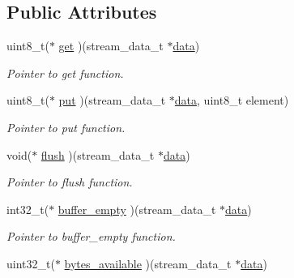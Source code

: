 \subsection*{Public Attributes}
\begin{DoxyCompactItemize}
\item 
\hypertarget{structbyte__stream__t_a434168a7d223feb6e21f6b2494879d1d}{uint8\+\_\+t($\ast$ \hyperlink{structbyte__stream__t_a434168a7d223feb6e21f6b2494879d1d}{get} )(stream\+\_\+data\+\_\+t $\ast$\hyperlink{structbyte__stream__t_a2869ca97951516e26f6dd0b215d9d4f8}{data})}\label{structbyte__stream__t_a434168a7d223feb6e21f6b2494879d1d}

\begin{DoxyCompactList}\small\item\em Pointer to get function. \end{DoxyCompactList}\item 
\hypertarget{structbyte__stream__t_ab297bd24b84a01414eee043c58332cc0}{uint8\+\_\+t($\ast$ \hyperlink{structbyte__stream__t_ab297bd24b84a01414eee043c58332cc0}{put} )(stream\+\_\+data\+\_\+t $\ast$\hyperlink{structbyte__stream__t_a2869ca97951516e26f6dd0b215d9d4f8}{data}, uint8\+\_\+t element)}\label{structbyte__stream__t_ab297bd24b84a01414eee043c58332cc0}

\begin{DoxyCompactList}\small\item\em Pointer to put function. \end{DoxyCompactList}\item 
\hypertarget{structbyte__stream__t_a62b978cadd9c89b8c726ded8c06fca62}{void($\ast$ \hyperlink{structbyte__stream__t_a62b978cadd9c89b8c726ded8c06fca62}{flush} )(stream\+\_\+data\+\_\+t $\ast$\hyperlink{structbyte__stream__t_a2869ca97951516e26f6dd0b215d9d4f8}{data})}\label{structbyte__stream__t_a62b978cadd9c89b8c726ded8c06fca62}

\begin{DoxyCompactList}\small\item\em Pointer to flush function. \end{DoxyCompactList}\item 
\hypertarget{structbyte__stream__t_ae5357dbbccb023202e314bd3d637283a}{int32\+\_\+t($\ast$ \hyperlink{structbyte__stream__t_ae5357dbbccb023202e314bd3d637283a}{buffer\+\_\+empty} )(stream\+\_\+data\+\_\+t $\ast$\hyperlink{structbyte__stream__t_a2869ca97951516e26f6dd0b215d9d4f8}{data})}\label{structbyte__stream__t_ae5357dbbccb023202e314bd3d637283a}

\begin{DoxyCompactList}\small\item\em Pointer to buffer\+\_\+empty function. \end{DoxyCompactList}\item 
\hypertarget{structbyte__stream__t_a350044ab9746aae372ec341b8a413f4a}{uint32\+\_\+t($\ast$ \hyperlink{structbyte__stream__t_a350044ab9746aae372ec341b8a413f4a}{bytes\+\_\+available} )(stream\+\_\+data\+\_\+t $\ast$\hyperlink{structbyte__stream__t_a2869ca97951516e26f6dd0b215d9d4f8}{data})}\label{structbyte__stream__t_a350044ab9746aae372ec341b8a413f4a}


\end{DoxyCompactItemize}
